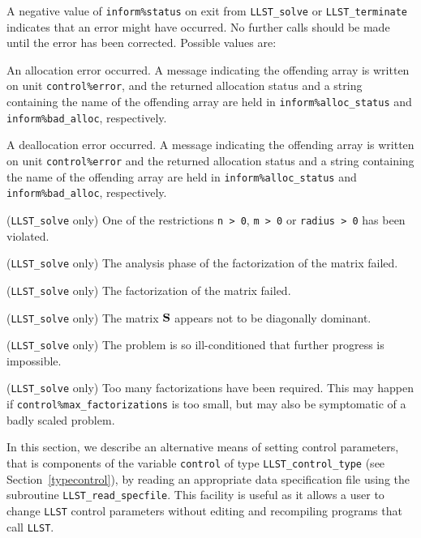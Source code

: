 \documentclass{galahad}
\newcommand{\packagename}{LLST}
\begin{document}

\galerrors
A negative value of  {\tt inform\%status} on exit from 
{\tt \packagename\_solve}
or 
{\tt \packagename\_terminate}
indicates that an error might have occurred. No further calls should be made
until the error has been corrected. Possible values are:

\begin{description}
 An allocation error occurred. A message indicating 
the offending 
array is written on unit {\tt control\%error}, and the returned allocation 
status and a string containing the name of the offending array
are held in {\tt inform\%alloc\_\-status}
and {\tt inform\%bad\_alloc}, respectively.

 A deallocation error occurred. 
A message indicating the offending 
array is written on unit {\tt control\%error} and the returned allocation 
status and a string containing the name of the offending array
are held in {\tt inform\%alloc\_\-status}
and {\tt inform\%bad\_alloc}, respectively.

 ({\tt \packagename\_solve} only) 
One of the restrictions 
{\tt n > 0},
{\tt m > 0}
or
{\tt radius > 0}
has been violated.
 
 ({\tt \packagename\_solve} only) 
The analysis phase of the factorization of the matrix  failed.

 ({\tt \packagename\_solve} only) 
The factorization of the matrix  failed.

 ({\tt \packagename\_solve} only) 
The matrix ${\mathbf{S}}$ appears not to be diagonally dominant. 
 
 ({\tt \packagename\_solve} only) 
The problem is so ill-conditioned that further progress is impossible.
 
 ({\tt \packagename\_solve} only) 
 Too many factorizations have been required.  This may happen if
    {\tt control\%max\_factorizations} is too small, 
    but may also be symptomatic of a badly scaled problem.

\end{description} 


\galfeatures
\noindent In this section, we describe an alternative means of setting 
control parameters, that is components of the variable {\tt control} of type
{\tt \packagename\_control\_type}
(see Section~\ref{typecontrol}), 
by reading an appropriate data specification file using the
subroutine {\tt \packagename\_read\_specfile}. This facility
is useful as it allows a user to change  {\tt \packagename} control parameters 
without editing and recompiling programs that call {\tt \packagename}.
\end{document}
